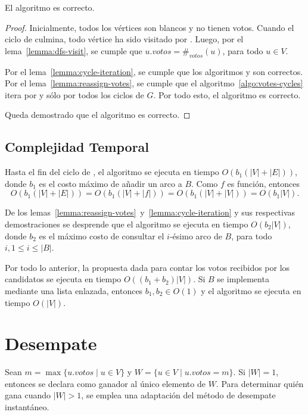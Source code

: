\begin{theorem}
    El algoritmo \dfscaption \;es correcto.
\end{theorem}

\begin{proof}
    Inicialmente, todos los v\'ertices son blancos y no tienen votos. Cuando el ciclo de \dfscaption \;culmina, todo v\'ertice ha sido visitado por \dfsvisitcaption. Luego, por el lema~\ref{lemma:dfs-visit}, se cumple que $u.votos = \#_{votos}(u)$, para todo $u \in V$.

    Por el lema~\ref{lemma:cycle-iteration}, se cumple que los algoritmos \maxincyclecaption \;y \setvotestoallincyclecaption \;son correctos.  Por el lema~\ref{lemma:reassign-votes}, se cumple que el algoritmo~\ref{algo:votes-cycles} itera por y s\'olo por todos los ciclos de $G$. Por todo esto, el algoritmo \cyclevotescaption \;es correcto.

    Queda demostrado que el algoritmo \dfscaption \;es correcto.
\end{proof}


\subsection{Complejidad Temporal}
Hasta el fin del ciclo de \dfscaption, el algoritmo se ejecuta en tiempo $O(b_1(|V| + |E|))$, donde $b_1$ es el costo m\'aximo de a\~nadir un arco a $B$. Como $f$ es funci\'on, entonces 
$$
O(b_1(|V| + |E|)) = O(b_1(|V| + |f|)) = O(b_1(|V| + |V|)) = O(b_1|V|).
$$

De los lemas~\ref{lemma:reassign-votes}~y~\ref{lemma:cycle-iteration} y sus respectivas demostraciones se desprende que el algoritmo \cyclevotescaption \;se ejecuta en tiempo $O(b_2|V|)$, donde $b_2$ es el m\'aximo costo de consultar el $i$-\'esimo arco de $B$, para todo $i, 1 \leq i \leq |B|$.

Por todo lo anterior, la propuesta dada para contar los votos recibidos por los candidatos se ejecuta en tiempo $O((b_1 + b_2)|V|)$. Si $B$ se implementa mediante una lista enlazada, entonces $b_1, b_2 \in O(1)$ y el algoritmo \dfscaption \;se ejecuta en tiempo $O(|V|)$.


\section{Desempate}
Sean $m = \max\{ u.votos \;|\; u \in V \}$ y $W = \{ u \in V \;|\; u.votos = m \}$.  Si $|W| = 1$, entonces se declara como ganador al \'unico elemento de $W$. Para determinar qui\'en gana cuando $|W| > 1$, se emplea una adaptaci\'on del m\'etodo de desempate instant\'aneo. 

